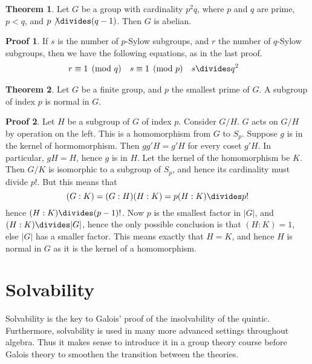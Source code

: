 \documentclass[12pt]{amsbook}
\theoremstyle{definition}
\newtheorem{theorem}{Theorem}[chapter]
\newtheorem*{prf}{Proof}
\begin{document}
\begin{theorem}
    Let $G$ be a group with cardinality $p^2q$, where $p$ and $q$ are prime, $p < q$, and $p \not \divides (q-1)$. Then $G$ is abelian.
\end{theorem}
\begin{prf}
    If $s$ is the number of $p$-Sylow subgroups, and $r$ the number of $q$-Sylow subgroups, then we have the following equations, as in the last proof.
    \begin{align*} r &\equiv 1 \pmod{q} & s &\equiv 1 \pmod{p} & s &\divides q^2 \end{align*}
\end{prf}

\begin{theorem}
    Let $G$ be a finite group, and $p$ the smallest prime of $G$. A subgroup of index $p$ is normal in $G$.
\end{theorem}
\begin{prf}
    Let $H$ be a subgroup of $G$ of index $p$. Consider $G/H$. $G$ acts on $G/H$ by operation on the left. This is a homomorphism from $G$ to $S_p$. Suppose $g$ is in the kernel of hormomorphism. Then $gg'H = g'H$ for every coset $g'H$. In particular, $gH = H$, hence $g$ is in $H$. Let the kernel of the homomorphism be $K$. Then $G/K$ is isomorphic to a subgroup of $S_p$, and hence its cardinality must divide $p!$. But this means that
    \[ (G:K) = (G:H)(H:K) = p(H:K) \divides p! \]
    hence $(H:K) \divides (p-1)!$. Now $p$ is the smallest factor in $|G|$, and $(H:K) \divides |G|$, hence the only possible conclusion is that $(H:K) = 1$, else $|G|$ has a smaller factor. This means exactly that $H = K$, and hence $H$ is normal in $G$ as it is the kernel of a homomorphism.
\end{prf}









\chapter{Solvability}

Solvability is the key to Galois' proof of the insolvability of the quintic. Furthermore, solvability is used in many more advanced settings throughout algebra. Thus it makes sense to introduce it in a group theory course before Galois theory to smoothen the transition between the theories.
\end{document}
